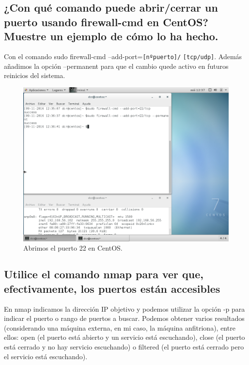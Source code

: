 \begin{flushleft}
\subsection{¿Con qué comando puede abrir/cerrar un puerto usando firewall-cmd en CentOS? Muestre un ejemplo de cómo lo ha hecho.}
Con el comando sudo firewall-cmd --add-port=\verb|[nºpuerto]/| \verb|[tcp/udp]|. Además añadimos la opción --permanent para que el cambio quede activo en futuros reinicios del sistema. \cite{c3b}
\begin{figure}[H]
	\centering
	\includegraphics[scale=0.4]{fcmd.png}
	\caption{Abrimos el puerto 22 en CentOS.}
\end{figure}

\subsection{Utilice el comando nmap para ver que, efectivamente, los puertos están accesibles}
En nmap indicamos la dirección IP objetivo y podemos utilizar la opción -p para indicar el puerto o rango de puertos a buscar\cite{c3c}. Podemos obtener varios resultados (considerando una máquina externa, en mi caso, la máquina anfitriona), entre ellos: open (el puerto está abierto y un servicio está escuchando), close (el puerto está cerrado y no hay servicio escuchando) o filtered (el puerto está cerrado pero el servicio está escuchando).


\end{flushleft}
